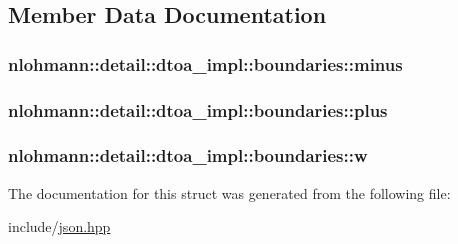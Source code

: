 \subsection{Member Data Documentation}
\subsubsection[{\texorpdfstring{minus}{minus}}]{ nlohmann\+::detail\+::dtoa\+\_\+impl\+::boundaries\+::minus}\hypertarget{structnlohmann_1_1detail_1_1dtoa__impl_1_1boundaries_aec4e5028333c01f3229062f31ce16763}{}\label{structnlohmann_1_1detail_1_1dtoa__impl_1_1boundaries_aec4e5028333c01f3229062f31ce16763}
\subsubsection[{\texorpdfstring{plus}{plus}}]{ nlohmann\+::detail\+::dtoa\+\_\+impl\+::boundaries\+::plus}\hypertarget{structnlohmann_1_1detail_1_1dtoa__impl_1_1boundaries_a3321ae2816a6ec5250a0d8e29f798232}{}\label{structnlohmann_1_1detail_1_1dtoa__impl_1_1boundaries_a3321ae2816a6ec5250a0d8e29f798232}
\subsubsection[{\texorpdfstring{w}{w}}]{ nlohmann\+::detail\+::dtoa\+\_\+impl\+::boundaries\+::w}\hypertarget{structnlohmann_1_1detail_1_1dtoa__impl_1_1boundaries_ad1668c60aeade5f2557fafed8b8aee1a}{}\label{structnlohmann_1_1detail_1_1dtoa__impl_1_1boundaries_ad1668c60aeade5f2557fafed8b8aee1a}


The documentation for this struct was generated from the following file\+:\begin{DoxyCompactItemize}
\item 
include/\hyperlink{json_8hpp}{json.\+hpp}\end{DoxyCompactItemize}
